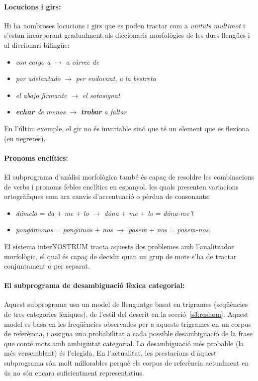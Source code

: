 \paragraph{Locucions i girs:} Hi ha nombroses locucions i girs que es poden tractar com a \emph{unitats
  multimot} i s'estan incorporant gradualment als diccionaris
morfològics de les dues llengües i al diccionari bilingüe:
\begin{itemize}
\item \emph{con cargo a} $\rightarrow$ \emph{a càrrec de}
\item \emph{por adelantado} $\rightarrow$ \emph{per endavant}, \emph{a la bestreta}
\item \emph{el abajo firmante} $\rightarrow$ \emph{el sotasignat}
\item \emph{{\bf echar} de menos} $\rightarrow$ \emph{{\bf trobar} a faltar}
\end{itemize}
En l'últim exemple, el gir no és invariable sinó que té un element que
es flexiona (en negretes).

\paragraph{Pronoms enclítics:} El subprograma d'anàlisi morfològica també és capaç de resoldre les
combinacions de verbs i pronoms febles enclítics en espanyol, les
quals presenten variacions ortogràfiques com ara canvis d'accentuació
o pèrdua de consonants:
\begin{itemize}
\item \emph{d\'{a}melo} = \emph{da} $+$ \emph{me} $+$ \emph{lo} $\rightarrow$
\emph{dóna} $+$ \emph{me} $+$ \emph{lo} = \emph{dóna-me'l}
\item \emph{pong\'{a}monos} = \emph{pongamos} $+$ \emph{nos} $\rightarrow$ {\em
posem} $+$ \emph{nos} = \emph{posem-nos}.  
\end{itemize}

El sistema interNOSTRUM tracta aquests dos problemes amb l'analitzador
morfològic, el qual és capaç de decidir quan un grup de mots s'ha de
tractar conjuntament o per separat. 

\paragraph{El subprograma de desambiguació lèxica categorial:} 
Aquest subprograma usa un model de llenguatge basat en trigrames
(se\-qüèn\-cies de tres categories lèxiques), de l'estil del descrit
en la secció~\ref{s3:reshom}. Aquest model es basa en les freqüències
observades per a aquests trigrames en un corpus de referència, i
assigna una probabilitat a cada possible desambiguació de la frase que
conté mots amb ambigüitat categorial. La desambiguació més probable
(la més versemblant) és l'elegida. En l'actualitat, les prestacions
d'aquest subprograma són molt millorables perquè els corpus de
referència actualment en ús no són encara suficientment
representatius.

